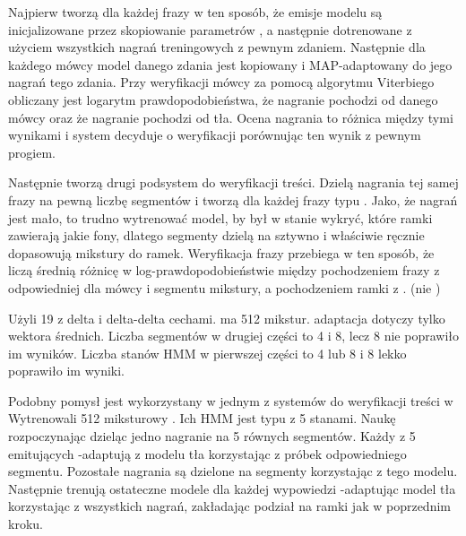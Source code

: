 Najpierw tworzą  dla każdej frazy w ten sposób, że emisje modelu są inicjalizowane przez 
skopiowanie parametrów , 
a następnie dotrenowane z użyciem wszystkich nagrań treningowych z pewnym zdaniem. 
Następnie dla każdego mówcy model danego zdania jest kopiowany i MAP-adaptowany do jego nagrań tego zdania. 
Przy weryfikacji mówcy za pomocą algorytmu Viterbiego obliczany jest logarytm 
prawdopodobieństwa, że nagranie pochodzi od danego mówcy oraz że nagranie pochodzi od  tła. 
Ocena nagrania to różnica między tymi wynikami i system decyduje o weryfikacji porównując ten wynik z pewnym progiem.

Następnie tworzą drugi podsystem do weryfikacji treści. Dzielą nagrania tej samej frazy na pewną liczbę segmentów
i tworzą dla każdej frazy  typu . Jako, że nagrań jest mało, to trudno
wytrenować model, by był w stanie wykryć, które ramki zawierają jakie fony, dlatego segmenty dzielą na sztywno
i właściwie ręcznie dopasowują mikstury do ramek. Weryfikacja frazy przebiega w ten sposób, że liczą średnią
różnicę w log-prawdopodobieństwie między pochodzeniem frazy z odpowiedniej dla mówcy i segmentu mikstury, a
pochodzeniem ramki z . (nie )

Użyli 19  z delta i delta-delta cechami.  ma 512 mikstur.  adaptacja 
dotyczy tylko wektora średnich. Liczba segmentów w drugiej części to 4 i 8, lecz 8 nie poprawiło im wyników. Liczba 
stanów HMM w pierwszej części to 4 lub 8 i 8 lekko poprawiło im wyniki.

Podobny pomysł jest wykorzystany w jednym z systemów do weryfikacji treści w 
Wytrenowali 512 miksturowy . Ich HMM jest typu  z 5 stanami. 
Naukę rozpoczynając dzieląc jedno nagranie na 5 równych segmentów. 
Każdy z 5  emitujących -adaptują z modelu tła korzystając z próbek odpowiedniego segmentu.
Pozostałe nagrania są dzielone na segmenty korzystając z tego modelu. Następnie trenują ostateczne modele dla każdej
wypowiedzi -adaptując model tła korzystając z wszystkich nagrań, zakładając podział na ramki jak
w poprzednim kroku.

